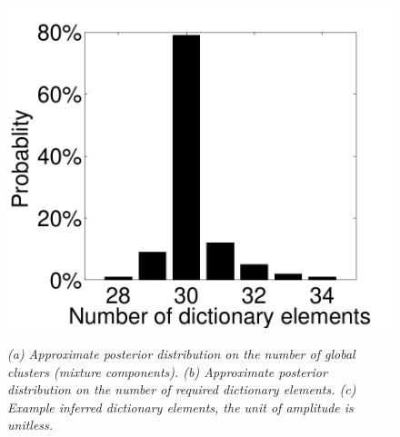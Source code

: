 \documentclass[journal]{IEEEtran}
\begin{document}
\begin{figure}[!htbp]
{ %
   \includegraphics[scale=.28,angle=0] {figs_new/posterior_b.pdf}
   \label{fig:post_dict}
 }\hspace{-3mm}
  \caption{\small \emph{(a) Approximate posterior distribution on the number of global clusters
(mixture components). (b) Approximate posterior distribution on the
number of required dictionary elements. (c) Example inferred
dictionary elements, the unit of amplitude is unitless.}}
\end{figure}
\end{document}

